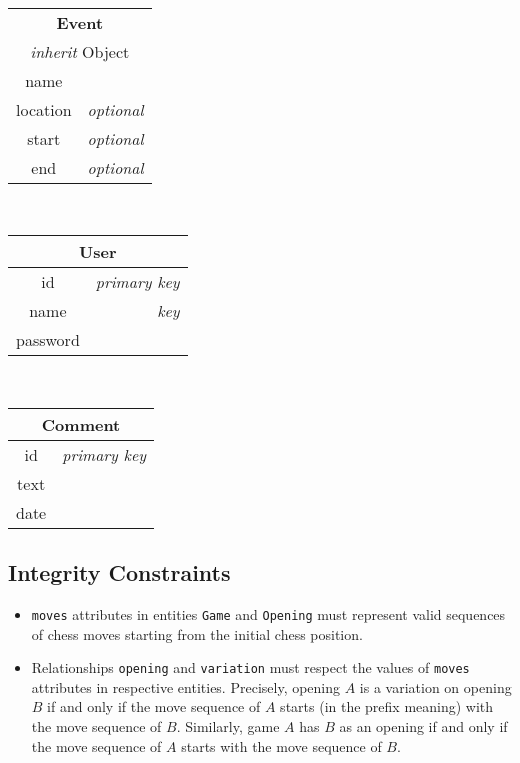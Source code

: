 \documentclass{article}
\begin{document}
\begin{table}[ht!]
\begin{subtable}{3.5cm}
    \end{subtable}
    ~
    \begin{subtable}{3.5cm}
	\begin{tabular}[t]{|cr|}
	\hline
	\multicolumn{2}{|c|}{\textbf{Event}} \\
	\multicolumn{2}{|c|}{\emph{inherit} Object} \\
	\hline
	name     &                  \\
	location & \emph{optional}    \\
	start    & \emph{optional}    \\
	end      & \emph{optional}    \\
	\hline
	\end{tabular}
    \end{subtable}
    ~
    \begin{subtable}{3.5cm}
	\begin{tabular}[t]{|cr|}
	\hline
	\multicolumn{2}{|c|}{\textbf{User}} \\
	\hline
	id       & \emph{primary key} \\
	name     & \emph{key}         \\
	password &                  \\
	\hline
	\end{tabular}
    \end{subtable}
    ~
    \begin{subtable}{3.5cm}
	\begin{tabular}[t]{|cr|}
	\hline
	\multicolumn{2}{|c|}{\textbf{Comment}} \\
	\hline
	id     & \emph{primary key} \\
	text   &                  \\
	date   &                  \\
	\hline
	\end{tabular}
    \end{subtable}
\end{table}


\subsection{Integrity Constraints}
\begin{itemize}
\item \verb|moves| attributes in entities \verb|Game| and \verb|Opening| must represent
valid sequences of chess moves starting from the initial chess position.

\item Relationships \verb|opening| and \verb|variation| must respect the values of \verb|moves|
attributes in respective entities.
Precisely, opening $A$ is a variation on opening $B$ if and only if the move sequence
of $A$ starts (in the prefix meaning) with the move sequence of $B$.
Similarly, game $A$ has $B$ as an opening if and only if the move sequence of $A$ starts
with the move sequence of $B$.
\end{itemize}
\end{document}
